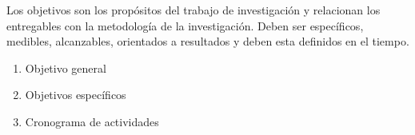 Los objetivos son los propósitos del trabajo de investigación y relacionan los entregables con la metodología de la investigación. Deben ser específicos, medibles, alcanzables, orientados a resultados y deben esta definidos en el tiempo.

\begin{enumerate}
	\item Objetivo general 
	\item Objetivos específicos 
	\item Cronograma de actividades 
\end{enumerate}
